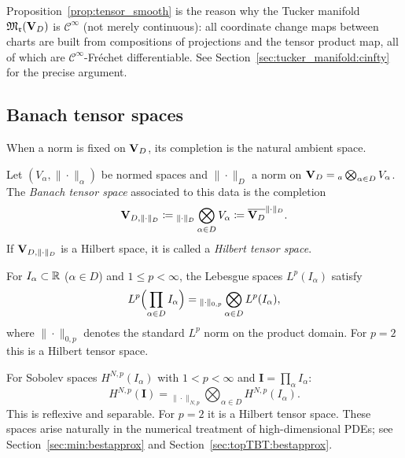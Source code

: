 \begin{remark}
\label{rem:regularity_Tucker}
Proposition~\ref{prop:tensor_smooth} is the reason why the Tucker manifold
$\mathfrak{M}_{\mathfrak{r}}(\mathbf{V}_D)$ is $\mathcal{C}^\infty$ (not merely continuous): all
coordinate change maps between charts are built from compositions of
projections and the tensor product map, all of which are
$\mathcal{C}^\infty$-Fréchet differentiable. See
Section~\ref{sec:tucker_manifold:cinfty} for the precise argument.
\end{remark}

\subsection*{Banach tensor spaces}

When a norm is fixed on $\mathbf{V}_D$, its completion is the natural ambient space.

\begin{definition}
\label{def:banach_tensor_space}
Let $(V_\alpha, \|\cdot\|_\alpha)$ be normed spaces and $\|\cdot\|_D$ a
norm on $\mathbf{V}_D = {}_a\bigotimes_{\alpha \in D} V_\alpha$. The
\emph{Banach tensor space} associated to this data is the completion
\begin{equation*}
    \mathbf{V}_{D,\|\cdot\|_D}
    \coloneqq
    {}_{\|\cdot\|_D}\bigotimes_{\alpha \in D} V_\alpha
    \coloneqq
    \overline{\mathbf{V}_D}^{\|\cdot\|_D}.
\end{equation*}
If $\mathbf{V}_{D,\|\cdot\|_D}$ is a Hilbert space, it is called a \emph{Hilbert tensor space}.
\end{definition}

\begin{example}
\label{ex:Lp_tensor}
For $I_\alpha \subset \mathbb{R}$ ($\alpha \in D$) and $1 \leq p < \infty$,
the Lebesgue spaces $L^p(I_\alpha)$ satisfy
\begin{equation*}
    L^p\Bigl(\prod_{\alpha \in D} I_\alpha\Bigr)
    = {}_{\|\cdot\|_{0,p}}\bigotimes_{\alpha \in D} L^p(I_\alpha),
\end{equation*}
where $\|\cdot\|_{0,p}$ denotes the standard $L^p$ norm on the product
domain. For $p=2$ this is a Hilbert tensor space.
\end{example}

\begin{example}
\label{ex:sobolev_tensor}
For Sobolev spaces $H^{N,p}(I_\alpha)$ with $1 < p < \infty$ and
$\mathbf{I} = \prod_\alpha I_\alpha$:
\begin{equation*}
    H^{N,p}(\mathbf{I})
    = {}_{\|\cdot\|_{N,p}}\bigotimes_{\alpha \in D} H^{N,p}(I_\alpha).
\end{equation*}
This is reflexive and separable. For $p=2$ it is a Hilbert tensor space.
These spaces arise naturally in the numerical treatment of high-dimensional
PDEs; see Section~\ref{sec:min:bestapprox} and
Section~\ref{sec:topTBT:bestapprox}.
\end{example}

